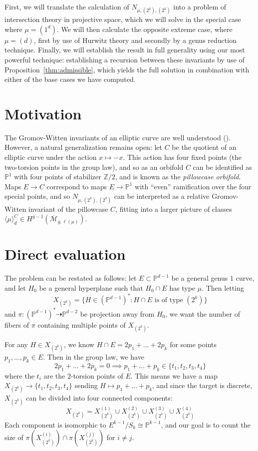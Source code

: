 \documentclass[thesis]{thesis-umich}           %
\newcommand{\Z}{\ensuremath{\mathbb{Z}}}
\renewcommand{\P}{\mathbb P}
\theoremstyle{definition}
\begin{document}
First, we will translate the calculation of $N_{\mu,(2^k),(2^k)}$ into a problem of intersection theory
in projective space, which we will solve in the special case where $\mu=(1^d)$.
We will then calculate the opposite extreme case, where $\mu=(d)$, first by use of Hurwitz theory and
secondly by a genus reduction technique. Finally, we will establish the result in full generality using
our most powerful technique: establishing a recursion between these invariants by use of Proposition~\ref{thm:admissible}, which yields the full solution in combination with either of the base
cases we have computed.

\section{Motivation}

The Gromov-Witten invariants of an elliptic curve are well understood (\cite{Completed}). However, a natural generalization
remains open: let $C$ be the quotient of an elliptic curve under the action $x\mapsto -x$.
This action has four fixed points (the two-torsion points in the group law), and so as an orbifold
$C$ can be identified as $\P^1$ with four points of stabilizer $\Z/2$, and is known as the
{\it pillowcase orbifold}. Maps $E\to C$ correspond to maps $E\to\P^1$ with ``even'' ramification over
the four special points, and so $N_{\mu,(2^k),(2^k)}$ can be interpreted as a relative Gromov-Witten
invariant of the pillowcase $C$, fitting into a larger picture of classes $\langle \mu\rangle_d^{C}\in H^{g-1}(\overline{\mathcal M}_{g,\ell(\mu)})$.

\section{Direct evaluation}
\label{section:direct2}

The problem can be restated as follows: let $E\subset \P^{d-1}$ be a general genus $1$ curve,
and let $H_0$ be a general hyperplane such that $H_0\cap E$ has type $\mu$. Then letting \[X_{(2^k)}=\{H\in(\P^{d-1})^*:H\cap E\text{ is of type }(2^k)\}\]
and $\pi:(\P^{d-1})^*\dashrightarrow \P^{d-2}$ be projection away from $H_0$, we want the number of fibers of $\pi$
containing multiple points of $X_{(2^k)}$.

For any $H\in X_{(2^k)}$, we know $H\cap E=2p_1+\dots+2p_k$ for some points $p_1,\dots,p_k\in E$. Then in the group law, we have
\[
2p_1+\dots+2p_k=0\implies p_1+\dots+p_k\in\{t_1,t_2,t_3,t_4\}
\]
where the $t_i$ are the $2$-torsion points of $E$. This means we have a map $X_{(2^k)}\to\{t_1,t_2,t_3,t_4\}$ sending $H\mapsto p_1+\dots+p_k$, and since the target is discrete, $X_{(2^k)}$ can be divided into four connected components:
\[
X_{(2^k)}=X_{(2^k)}^{(1)}\cup X_{(2^k)}^{(2)}\cup X_{(2^k)}^{(3)}\cup X_{(2^k)}^{(4)}
\]
Each component is isomorphic to $E^{k-1}/S_k\cong \P^{k-1}$,
and our goal is to count the size of $\pi(X_{(2^k)}^{(i)})\cap \pi(X_{(2^k)}^{(j)})$
for $i\neq j$.
\end{document}
